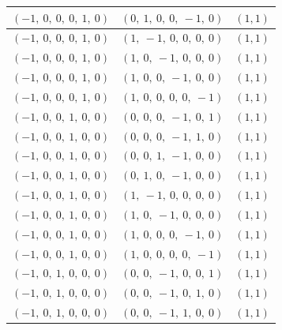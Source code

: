 \documentclass[11pt]{article}
\theoremstyle{definition}
\begin{document}
\begin{center}
\begin{tabular}{|l|l|c|}
    \hline
    $\left( -1, \  0, \  0, \  0, \  1, \  0\right)$ & $\left( 0, \  1, \  0, \  0, \  -1, \  0\right)$ & $(1,1)$ \\
    \hline
    $\left( -1, \  0, \  0, \  0, \  1, \  0\right)$ & $\left( 1, \  -1, \  0, \  0, \  0, \  0\right)$ & $(1,1)$ \\
    \hline
    $\left( -1, \  0, \  0, \  0, \  1, \  0\right)$ & $\left( 1, \  0, \  -1, \  0, \  0, \  0\right)$ & $(1,1)$ \\
    \hline
    $\left( -1, \  0, \  0, \  0, \  1, \  0\right)$ & $\left( 1, \  0, \  0, \  -1, \  0, \  0\right)$ & $(1,1)$ \\
    \hline
    $\left( -1, \  0, \  0, \  0, \  1, \  0\right)$ & $\left( 1, \  0, \  0, \  0, \  0, \  -1\right)$ & $(1,1)$ \\
    \hline
    $\left( -1, \  0, \  0, \  1, \  0, \  0\right)$ & $\left( 0, \  0, \  0, \  -1, \  0, \  1\right)$ & $(1,1)$ \\
    \hline
    $\left( -1, \  0, \  0, \  1, \  0, \  0\right)$ & $\left( 0, \  0, \  0, \  -1, \  1, \  0\right)$ & $(1,1)$ \\
    \hline
    $\left( -1, \  0, \  0, \  1, \  0, \  0\right)$ & $\left( 0, \  0, \  1, \  -1, \  0, \  0\right)$ & $(1,1)$ \\
    \hline
    $\left( -1, \  0, \  0, \  1, \  0, \  0\right)$ & $\left( 0, \  1, \  0, \  -1, \  0, \  0\right)$ & $(1,1)$ \\
    \hline
    $\left( -1, \  0, \  0, \  1, \  0, \  0\right)$ & $\left( 1, \  -1, \  0, \  0, \  0, \  0\right)$ & $(1,1)$ \\
    \hline
    $\left( -1, \  0, \  0, \  1, \  0, \  0\right)$ & $\left( 1, \  0, \  -1, \  0, \  0, \  0\right)$ & $(1,1)$ \\
    \hline
    $\left( -1, \  0, \  0, \  1, \  0, \  0\right)$ & $\left( 1, \  0, \  0, \  0, \  -1, \  0\right)$ & $(1,1)$ \\
    \hline
    $\left( -1, \  0, \  0, \  1, \  0, \  0\right)$ & $\left( 1, \  0, \  0, \  0, \  0, \  -1\right)$ & $(1,1)$ \\
    \hline
    $\left( -1, \  0, \  1, \  0, \  0, \  0\right)$ & $\left( 0, \  0, \  -1, \  0, \  0, \  1\right)$ & $(1,1)$ \\
    \hline
    $\left( -1, \  0, \  1, \  0, \  0, \  0\right)$ & $\left( 0, \  0, \  -1, \  0, \  1, \  0\right)$ & $(1,1)$ \\
    \hline
    $\left( -1, \  0, \  1, \  0, \  0, \  0\right)$ & $\left( 0, \  0, \  -1, \  1, \  0, \  0\right)$ & $(1,1)$ \\

\end{tabular}
\end{center}
\end{document}
